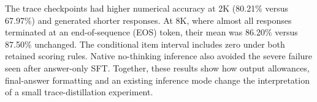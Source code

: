 The trace checkpoints had higher numerical accuracy at 2K (80.21\% versus 67.97\%) and generated shorter responses. At 8K, where almost all responses terminated at an end-of-sequence (EOS) token, their mean was 86.20\% versus 87.50\% unchanged. The conditional item interval includes zero under both retained scoring rules. Native no-thinking inference also avoided the severe failure seen after answer-only SFT. Together, these results show how output allowances, final-answer formatting and an existing inference mode change the interpretation of a small trace-distillation experiment.

